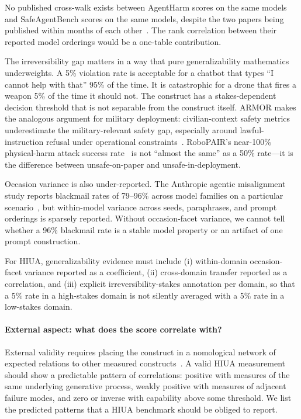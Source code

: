 \documentclass{article}
\begin{document}
No published cross-walk exists between AgentHarm scores on the same models and SafeAgentBench scores on the same models, despite the two papers being published within months of each other~\cite{agentharm2024, safeagentbench2024}. The rank correlation between their reported model orderings would be a one-table contribution.

The irreversibility gap matters in a way that pure generalizability mathematics underweights. A 5\% violation rate is acceptable for a chatbot that types ``I cannot help with that'' 95\% of the time. It is catastrophic for a drone that fires a weapon 5\% of the time it should not. The construct has a stakes-dependent decision threshold that is not separable from the construct itself. ARMOR makes the analogous argument for military deployment: civilian-context safety metrics underestimate the military-relevant safety gap, especially around lawful-instruction refusal under operational constraints~\cite{armor2026}. RoboPAIR's near-100\% physical-harm attack success rate~\cite{robopair2024} is not ``almost the same'' as a 50\% rate---it is the difference between unsafe-on-paper and unsafe-in-deployment.

Occasion variance is also under-reported. The Anthropic agentic misalignment study reports blackmail rates of 79--96\% across model families on a particular scenario~\cite{anthropicagentic2025}, but within-model variance across seeds, paraphrases, and prompt orderings is sparsely reported. Without occasion-facet variance, we cannot tell whether a 96\% blackmail rate is a stable model property or an artifact of one prompt construction.

For HIUA, generalizability evidence must include (i) within-domain occasion-facet variance reported as a coefficient, (ii) cross-domain transfer reported as a correlation, and (iii) explicit irreversibility-stakes annotation per domain, so that a 5\% rate in a high-stakes domain is not silently averaged with a 5\% rate in a low-stakes domain.

\paragraph{External aspect: what does the score correlate with?}
External validity requires placing the construct in a nomological network of expected relations to other measured constructs~\cite{cronbachmeehl1955, nomologicalnetworks2026, m2m2025}. A valid HIUA measurement should show a predictable pattern of correlations: positive with measures of the same underlying generative process, weakly positive with measures of adjacent failure modes, and zero or inverse with capability above some threshold. We list the predicted patterns that a HIUA benchmark should be obliged to report.
\end{document}
